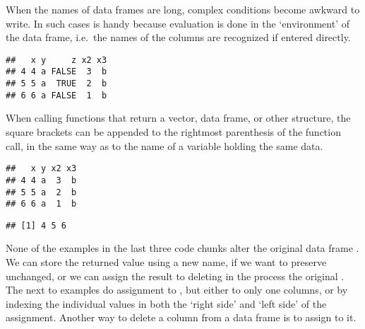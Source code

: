 \documentclass[paper=a4,headsepline,BCOR=12mm,twoside,open=right,%
titlepage,headings=small,fontsize=10pt,index=totoc,bibliography=totoc,%
captions=tableheading,captions=nooneline]{scrbook}\usepackage{knitr}
\begin{document}
When the names of data frames are long, complex conditions become awkward to write. In such cases  is handy because evaluation is done in the `environment' of the data frame, i.e.\ the names of the columns are recognized if entered directly.

\begin{knitrout}\footnotesize
{}\color{fgcolor}\begin{kframe}
\begin{alltt}
 \hlopt{>} \hlstd{)}
\end{alltt}
\begin{verbatim}
##   x y     z x2 x3
## 4 4 a FALSE  3  b
## 5 5 a  TRUE  2  b
## 6 6 a FALSE  1  b
\end{verbatim}
\end{kframe}
\end{knitrout}

When calling functions that return a vector, data frame, or other structure, the square brackets can be appended to the rightmost parenthesis of the function call, in the same way as to the name of a variable holding the same data.

\begin{knitrout}\footnotesize
{}\color{fgcolor}\begin{kframe}
\begin{alltt}
 \hlopt{>} \hlstd{)[ ,} \hlopt{-}\hlstd{]}
\end{alltt}
\begin{verbatim}
##   x y x2 x3
## 4 4 a  3  b
## 5 5 a  2  b
## 6 6 a  1  b
\end{verbatim}
\begin{alltt}
 \hlopt{>} \hlstd{)}\hlopt{$}
\end{alltt}
\begin{verbatim}
## [1] 4 5 6
\end{verbatim}
\end{kframe}
\end{knitrout}

None of the examples in the last three code chunks alter the original data frame . We can store the returned value using a new name, if we want to preserve  unchanged, or we can assign the result to  deleting in the process the original . The next to examples do assignment to , but either to only one columns, or by indexing the individual values in both the `right side' and `left side' of the assignment.
Another way to delete a column from a data frame is to assign  to it.
\end{document}
